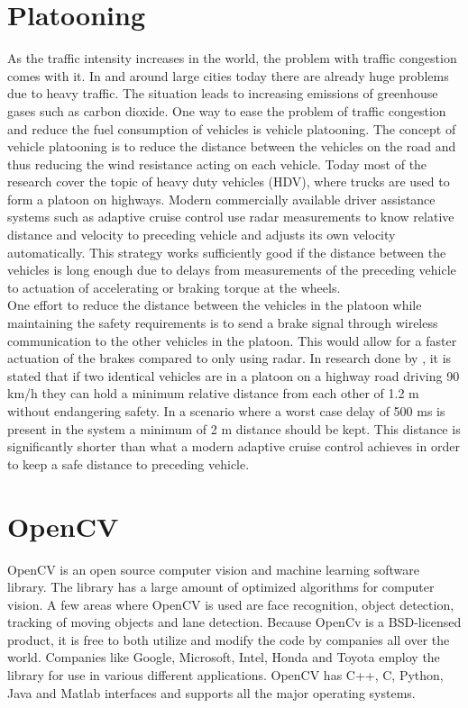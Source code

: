 \section{Platooning}
As the traffic intensity increases in the world, the problem with traffic congestion comes with it. In and around large cities today there are already huge problems due to heavy traffic. The situation leads to increasing emissions of greenhouse gases such as carbon dioxide. One way to ease the problem of traffic congestion and reduce the fuel consumption of vehicles is vehicle platooning. The concept of vehicle platooning is to reduce the distance between the vehicles on the road and thus reducing the wind resistance acting on each vehicle. Today most of the research cover the topic of heavy duty vehicles (HDV), where trucks are used to form a platoon on highways. Modern commercially available driver assistance systems such as adaptive cruise control use radar measurements to know relative distance and velocity to preceding vehicle and adjusts its own velocity automatically. This strategy works sufficiently good if the distance between the vehicles is long enough due to delays from measurements of the preceding vehicle to actuation of accelerating or braking torque at the wheels.\\

One effort to reduce the distance between the vehicles in the platoon while maintaining the safety requirements is to send a brake signal through wireless communication to the other vehicles in the platoon. This would allow for a faster actuation of the brakes compared to only using radar. In research done by \cite{alam2014guaranteeing}, it is stated that if two identical vehicles are in a platoon on a highway road driving 90 km/h they can hold a minimum relative distance from each other of 1.2 m without endangering safety. In a scenario where a worst case delay of 500 ms is present in the system a minimum of 2 m distance should be kept. This distance is significantly shorter than what a modern adaptive cruise control achieves in order to keep a safe distance to preceding vehicle.\\




\section{OpenCV}
OpenCV is an open source computer vision and machine learning software library. The library has a large amount of optimized algorithms for computer vision. A few areas where OpenCV is used are face recognition, object detection, tracking of moving objects and lane detection. Because OpenCv is a BSD-licensed product, it is free to both utilize and modify the code by companies all over the world. Companies like Google, Microsoft, Intel, Honda and Toyota employ the library for use in various different applications. OpenCV has C++, C, Python, Java and Matlab interfaces and supports all the major operating systems.\\

